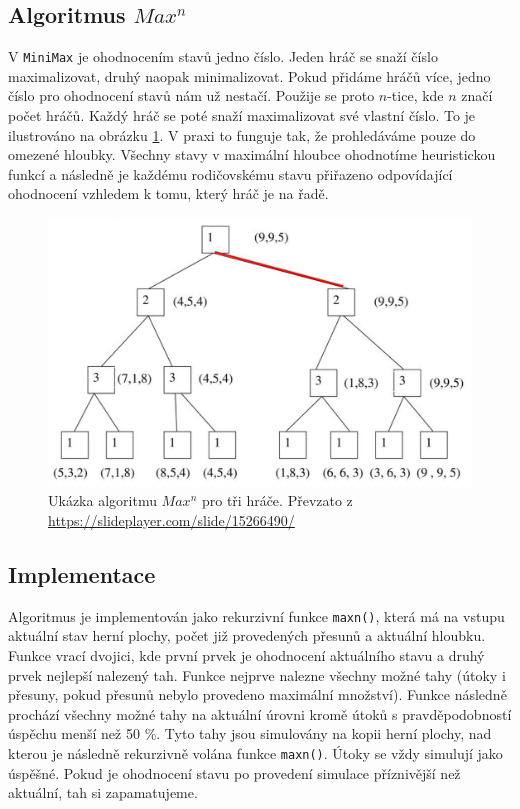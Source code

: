 \documentclass[a4paper,11pt]{article}
\begin{document}
	\subsection{Algoritmus \texttt{$Max^n$}}
		V \texttt{MiniMax} je ohodnocením stavů jedno číslo. Jeden hráč se snaží číslo maximalizovat, druhý naopak minimalizovat. Pokud přidáme hráčů více, jedno číslo pro ohodnocení stavů nám už nestačí. Použije se proto $n$-tice, kde $n$ značí počet hráčů. Každý hráč se poté snaží maximalizovat své vlastní číslo. To je ilustrováno na obrázku \ref{fig:maxn}. V praxi to funguje tak, že prohledáváme pouze do omezené hloubky. Všechny stavy v maximální hloubce ohodnotíme heuristickou funkcí a následně je každému rodičovskému stavu přiřazeno odpovídající ohodnocení vzhledem k tomu, který hráč je na řadě.
		
		\begin{figure}[h]
			\label{fig:maxn}
			\centering
			\includegraphics[scale=0.5]{maxn.png}
			\caption{Ukázka algoritmu \texttt{$Max^n$} pro tři hráče. Převzato z \url{https://slideplayer.com/slide/15266490/}}
		\end{figure}
		
	\subsection{Implementace}
		Algoritmus je implementován jako rekurzivní funkce \texttt{maxn()}, která má na vstupu aktuální stav herní plochy, počet již provedených přesunů a aktuální hloubku. Funkce vrací dvojici, kde první prvek je ohodnocení aktuálního stavu a druhý prvek nejlepší nalezený tah. Funkce nejprve nalezne všechny možné tahy (útoky i přesuny, pokud přesunů nebylo provedeno maximální množství). Funkce následně prochází všechny možné tahy na aktuální úrovni kromě útoků s pravděpodobností úspěchu menší než 50 \%. Tyto tahy jsou simulovány na kopii herní plochy, nad kterou je následně rekurzivně volána funkce \texttt{maxn()}. Útoky se vždy simulují jako úspěšné.
		Pokud je ohodnocení stavu po provedení simulace příznivější než aktuální, tah si zapamatujeme.
		
\end{document}
